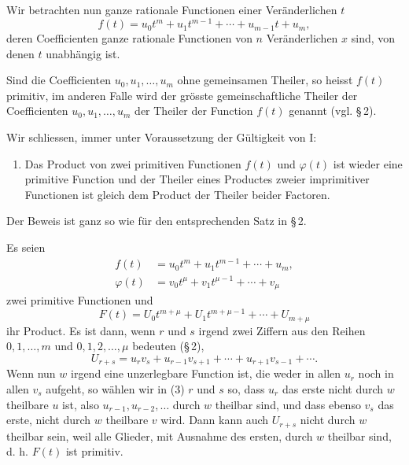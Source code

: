\documentclass[11pt]{article}
\begin{document}
Wir betrachten nun ganze rationale Functionen einer Veränderlichen $t$
\[
f(t)=u_0t^m+u_1t^{m-1}+\cdots+u_{m-1}t+u_m,
\]
deren Coefficienten ganze rationale Functionen von $n$ Veränderlichen $x$ sind, von denen $t$ unabhängig ist.

Sind die Coefficienten $u_0,u_1,\ldots,u_m$ ohne gemeinsamen Theiler, so heisst $f(t)$ primitiv, im anderen Falle wird der grösste gemeinschaftliche Theiler der Coefficienten $u_0,u_1,\ldots,u_m$ der Theiler der Function $f(t)$ genannt (vgl. \S\,2).

Wir schliessen, immer unter Voraussetzung der Gültigkeit von I:

\begin{enumerate}[label=\Roman*.,leftmargin=2.4em,start=5]
\item Das Product von zwei primitiven Functionen $f(t)$ und $\varphi(t)$ ist wieder eine primitive Function und der Theiler eines Productes zweier imprimitiver Functionen ist gleich dem Product der Theiler beider Factoren.
\end{enumerate}

Der Beweis ist ganz so wie für den entsprechenden Satz in \S\,2.

Es seien
\begin{equation}
\begin{aligned}
f(t)&=u_0t^m+u_1t^{m-1}+\cdots+u_m,\\
\varphi(t)&=v_0t^\mu+v_1t^{\mu-1}+\cdots+v_\mu
\end{aligned}
\tag{1}
\end{equation}
zwei primitive Functionen und
\begin{equation}
F(t)=U_0t^{m+\mu}+U_1t^{m+
\mu-1}+\cdots+U_{m+\mu}
\tag{2}
\end{equation}
ihr Product. Es ist dann, wenn $r$ und $s$ irgend zwei Ziffern aus den Reihen $0,1,\ldots,m$ und $0,1,2,\ldots,\mu$ bedeuten (\S\,2),
\begin{equation}
U_{r+s}=u_rv_s+u_{r-1}v_{s+1}+\cdots+u_{r+1}v_{s-1}+\cdots.
\tag{3}
\end{equation}
Wenn nun $w$ irgend eine unzerlegbare Function ist, die weder in allen $u_r$ noch in allen $v_s$ aufgeht, so wählen wir in (3) $r$ und $s$ so, dass $u_r$ das erste nicht durch $w$ theilbare $u$ ist, also $u_{r-1},u_{r-2},\ldots$ durch $w$ theilbar sind, und dass ebenso $v_s$ das erste, nicht durch $w$ theilbare $v$ wird. Dann kann auch $U_{r+s}$ nicht durch $w$ theilbar sein, weil alle Glieder, mit Ausnahme des ersten, durch $w$ theilbar sind, d. h. $F(t)$ ist primitiv.
\end{document}
